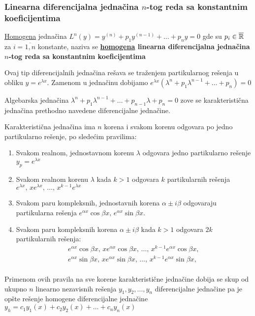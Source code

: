 \subsubsection{Linearna diferencijalna jednačina $n$-tog reda sa konstantnim koeficijentima}
\begin{definition}
	\underline{Homogena} jednačina $L^n(y) = y^{(n)} + p_1 y^{(n-1)} + \ldots + p_n y = 0$ gde su $p_i \in \overline{\mathbb{R}}$ za $i = \overline{1, n}$ konstante, naziva se \textbf{\underline{homogena} linearna diferencijalna jednačina $n$-tog reda sa konstantnim koeficijentima}\\
\end{definition}
Ovaj tip diferencijalnih jednačina rešava se traženjem partikularnog rešenja u obliku $y = e^{\lambda x}$. Zamenom u jednačinu dobijamo $e^{\lambda x}(\lambda^n + p_1 \lambda^{n-1} + \ldots + p_n) = 0$
\begin{definition}
	Algebarska jednačina $\lambda^n + p_1 \lambda^{n-1} + \ldots + p_{n-1} \lambda + p_n = 0$ zove se karakteristična jednačina prethodno navedene diferencijalne jednačine.
\end{definition}
Karakteristična jednačina ima $n$ korena i svakom korenu odgovara po jedno partikularno rešenje, po sledećim pravilima:
\begin{enumerate}[label = \arabic*)]
	\item Svakom realnom, jednostavnom korenu $\lambda$ odgovara jedno partikularno rešenje $y_p = e^{\lambda x}$
	\item Svakom realnom korenu $\lambda$ kada $k > 1$ odgovara $k$ partikularnih rešenja $e^{\lambda x}, \, x e^{\lambda x}, \, \ldots, \, x^{k-1} e^{\lambda x}$
	\item Svakom paru kompleksnih, jednostavnih korena $\alpha \pm i \beta$ odgovaraju partikularna rešenja $e^{\alpha x}\cos \beta x, \, e^{\alpha x} \sin \beta x$.
	\item Svakom paru kompleksnih korena $\alpha \pm i \beta$ kada $k > 1$ odgovara $2k$ partikularnih rešenja:
	\begin{gather*}
		e^{\alpha x} \cos \beta x, \, xe^{\alpha x} \cos \beta x, \, \ldots, \, x^{k-1}e^{\alpha x} \cos \beta x, \, \\
		e^{\alpha x} \sin \beta x, \, xe^{\alpha x} \sin \beta x, \, \ldots, \, x^{k-1}e^{\alpha x} \sin \beta x, \, \\
	\end{gather*}
\end{enumerate}
Primenom ovih pravila na sve korene karakteristične jednačine dobija se skup od ukupno $n$ linearno nezavisnih rešenja $y_1, y_2, \ldots, y_n$ diferencijalne jednačine pa je opšte rešenje homogene diferencijalne jednačine $y_h = c_1 y_1(x) + c_2 y_2(x) + \ldots + c_n y_n(x)$
